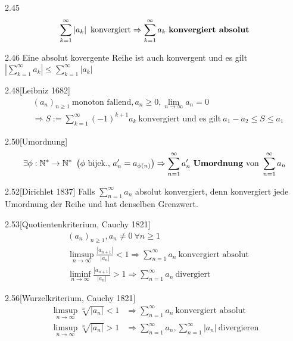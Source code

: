 \documentclass[8pt,a4paper,twocolumn,table]{extarticle}
\newcommand{\N}{\mathbb{N}}
\newcommand{\seq}[1]{\left( #1_n \right)_{n \ge 1}}
\begin{document}
\begin{definition}{2.45}
    \[ \sum_{k=1}^\infty \left| a_k \right|\ \mbox{konvergiert} \Rightarrow  \sum_{k=1}^\infty a_k\ \mbox{\textbf{konvergiert absolut}} \]
\end{definition}

\begin{satz}{2.46}
    Eine absolut kovergente Reihe ist auch konvergent und es gilt $\left| \sum_{k=1}^\infty a_k \right| \le \sum_{k=1}^\infty \left| a_k \right|$
\end{satz}

\begin{satz}{2.48}[Leibniz 1682]
    \begin{align*}
         & \seq{a}\ \mbox{monoton fallend}, a_n \ge 0, \lim_{n \to \infty} a_n = 0                                     \\
         & \Rightarrow S := \sum_{k=1}^\infty (-1)^{k+1} a_k \ \mbox{konvergiert und es gilt}\ a_1 - a_2 \le S \le a_1
    \end{align*}
\end{satz}

\begin{definition}{2.50}[Umordnung]
    \[
        \exists \phi: \N^* \to \N^*\ \left( \phi\ \mbox{bijek.,}\ a'_n = a_{\phi(n)} \right)
        \Rightarrow
        \sum_{n=1}^\infty a'_n\ \mbox{\textbf{Umordnung} von}\ \sum_{n=1}^\infty a_n
    \]
\end{definition}

\begin{satz}{2.52}[Dirichlet 1837]
    Falls $\sum_{n=1}^\infty a_n$ absolut konvergiert, denn konvergiert jede Umordnung der Reihe und hat denselben Grenzwert.
\end{satz}

\begin{satz}{2.53}[Quotientenkriterium, Cauchy 1821]
    \begin{align*}
         & \seq{a}, a_n \ne 0\ \forall n \ge 1                                                                              \\
         & \limsup_{n \to \infty} \frac{|a_{n+1}|}{|a_n|} < 1 \Rightarrow \sum_{n=1}^\infty a_n\ \mbox{konvergiert absolut} \\
         & \liminf_{n \to \infty} \frac{|a_{n+1}|}{|a_n|} > 1 \Rightarrow \sum_{n=1}^\infty a_n\ \mbox{divergiert}
    \end{align*}
\end{satz}

\begin{satz}{2.56}[Wurzelkriterium, Cauchy 1821]
    \begin{align*}
        \limsup_{n \to \infty} \sqrt[n]{|a_n|} < 1 & \Rightarrow \sum_{n=1}^\infty a_n\ \mbox{konvergiert absolut}                  \\
        \limsup_{n \to \infty} \sqrt[n]{|a_n|} > 1 & \Rightarrow \sum_{n=1}^\infty a_n, \sum_{n=1}^\infty |a_n|\ \mbox{divergieren}
    \end{align*}
\end{satz}
\end{document}
